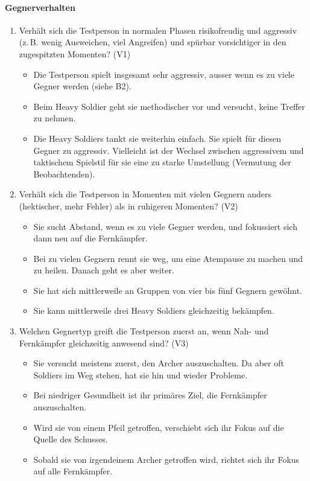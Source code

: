 \documentclass[../Main.tex]{subfiles}
\begin{document}
\paragraph{Gegnerverhalten}
\begin{enumerate}[label=\textbf{B\arabic*}, leftmargin=1.5cm, itemsep=0.8em]
    \item Verhält sich die Testperson in normalen Phasen risikofreudig und aggressiv (z.\,B. wenig Ausweichen, viel Angreifen) und spürbar vorsichtiger in den zugespitzten Momenten? \hfill (V1)
        \begin{itemize}[nosep]
            \item Die Testperson spielt insgesamt sehr aggressiv, ausser wenn es zu viele Gegner werden (siehe B2).
            \item Beim Heavy Soldier geht sie methodischer vor und versucht, keine Treffer zu nehmen.
            \item Die Heavy Soldiers tankt sie weiterhin einfach. Sie spielt für diesen Gegner zu aggressiv. Vielleicht ist der Wechsel zwischen aggressivem und taktischem Spielstil für sie eine zu starke Umstellung (Vermutung der Beobachtenden).
        \end{itemize}

    \item Verhält sich die Testperson in Momenten mit vielen Gegnern anders (hektischer, mehr Fehler) als in ruhigeren Momenten? \hfill (V2)
        \begin{itemize}[nosep]
            \item Sie sucht Abstand, wenn es zu viele Gegner werden, und fokussiert sich dann neu auf die Fernkämpfer.
            \item Bei zu vielen Gegnern rennt sie weg, um eine Atempause zu machen und zu heilen. Danach geht es aber weiter.
            \item Sie hat sich mittlerweile an Gruppen von vier bis fünf Gegnern gewöhnt.
            \item Sie kann mittlerweile drei Heavy Soldiers gleichzeitig bekämpfen.
        \end{itemize}

    \item Welchen Gegnertyp greift die Testperson zuerst an, wenn Nah- und Fernkämpfer gleichzeitig anwesend sind? \hfill (V3)
        \begin{itemize}[nosep]
            \item Sie versucht meistens zuerst, den Archer auszuschalten. Da aber oft Soldiers im Weg stehen, hat sie hin und wieder Probleme.
            \item Bei niedriger Gesundheit ist ihr primäres Ziel, die Fernkämpfer auszuschalten.
            \item Wird sie von einem Pfeil getroffen, verschiebt sich ihr Fokus auf die Quelle des Schusses.
            \item Sobald sie von irgendeinem Archer getroffen wird, richtet sich ihr Fokus auf alle Fernkämpfer.
        \end{itemize}


\end{enumerate}
\end{document}
